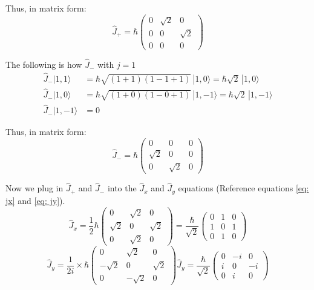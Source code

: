 \documentclass[12pt]{article}
\begin{document}
        Thus, in matrix form:
        \[
            \hat{J}_+ = \hbar \begin{pmatrix}
                0 & \sqrt{2} & 0 \\
                0 & 0 & \sqrt{2} \\
                0 & 0 & 0
            \end{pmatrix}
        \]

        The following is how $\hat{J}_-$ with $j=1$
        \begin{align*}
            \hat{J}_- |1,1\rangle &= \hbar \sqrt{(1+1)(1-1+1)} \, |1,0\rangle = \hbar \sqrt{2} \, |1,0\rangle \\
            \hat{J}_- |1,0\rangle &= \hbar \sqrt{(1+0)(1-0+1)} \, |1,-1\rangle = \hbar \sqrt{2} \, |1,-1\rangle \\
            \hat{J}_- |1,-1\rangle &= 0
        \end{align*}

        Thus, in matrix form:
        \[
            \hat{J}_- = \hbar \begin{pmatrix}
                0 & 0 & 0 \\
                \sqrt{2} & 0 & 0 \\
                0 & \sqrt{2} & 0
            \end{pmatrix}
        \]

        Now we plug in $\hat{J}_+$ and $\hat{J}_-$ into the $\hat{J}_x$ and $\hat{J}_y$ equations (Reference equations \ref{eq: jx} and \ref{eq: jy}). 
        \begin{equation} \label{eq: JX}
            \hat{J}_x = \frac{1}{2} \hbar
            \begin{pmatrix}
                0 & \sqrt{2} & 0 \\
                \sqrt{2} & 0 & \sqrt{2} \\
                0 & \sqrt{2} & 0
            \end{pmatrix}
            = \frac{\hbar}{\sqrt{2}}
            \begin{pmatrix}
                0 & 1 & 0 \\
                1 & 0 & 1 \\
                0 & 1 & 0
            \end{pmatrix}
        \end{equation}
        \begin{equation} \label{eq: JY}
            \hat{J}_y = \frac{1}{2i} \times \hbar
            \begin{pmatrix}
                0 & \sqrt{2} & 0 \\
                -\sqrt{2} & 0 & \sqrt{2} \\
                0 & -\sqrt{2} & 0
            \end{pmatrix}
            \hat{J}_y = \frac{\hbar}{\sqrt{2}}
            \begin{pmatrix}
                0 & -i & 0 \\
                i & 0 & -i \\
                0 & i & 0
            \end{pmatrix}
        \end{equation}
\end{document}

